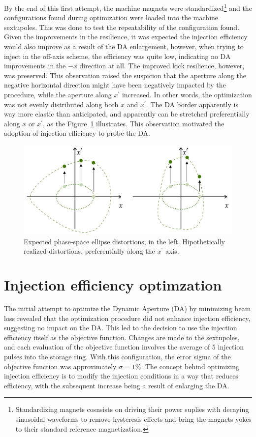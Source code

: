 By the end of this first attempt, the machine magnets were standardized\footnote{Standardizing magnets cosnsists on driving their power suplies with decaying sinusoidal waveforms to remove hysteresis effects and bring the magnets yokes to their standard reference magnetization.} and the configurations found during optimization were loaded into the machine sextupoles. This was done to test the repeatability of the configuration found. Given the improvements in the resilience, it was expected the injection efficiency would also improve as a result of the DA enlargement, however, when trying to inject in the off-axis scheme, the efficiency was quite low, indicating no DA improvements in the $-x$ direction at all. The improved kick resilience, however, was preserved. This observation raised the suspicion that the aperture along the negative horizontal direction might have been negatively impacted by the procedure, while the aperture along $x^\prime$ increased. In other words, the optimization was not evenly distributed along both $x$ and $x^\prime$. The DA border apparently is way more elastic than anticipated, and apparently can be stretched preferentially along $x$ or $x^\prime$, as the Figure~\ref{fig:expected_vs_reality_DA} illustrates. This observation motivated the adoption of injection efficiency to probe the DA.
\begin{figure}
    \centering
    \includegraphics[width=\textwidth]{Images/elastic_phase_space_distortion.pdf}
    \caption[Expected phase-space ellipse distortions vs. hipothetically realized distortions.]{Expected phase-space ellipse distortions, in the left. Hipothetically realized distortions, preferentially along the $x^\prime$ axis.}
    \label{fig:expected_vs_reality_DA}
\end{figure}
\section{Injection efficiency optimzation}
The initial attempt to optimize the Dynamic Aperture (DA) by minimizing beam loss revealed that the optimization procedure did not enhance injection efficiency, suggesting no impact on the DA. This led to the decision to use the injection efficiency itself as the objective function. Changes are made to the sextupoles, and each evaluation of the objective function involves the average of 5 injection pulses into the storage ring. With this configuration, the error sigma of the objective function was approximately $\sigma=1\%$. The concept behind optimizing injection efficiency is to modify the injection conditions in a way that reduces efficiency, with the subsequent increase being a result of enlarging the DA.

